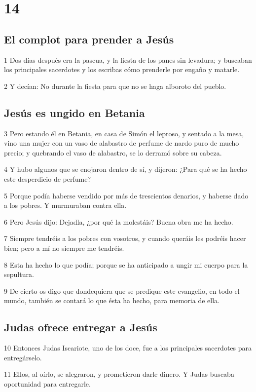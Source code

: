 \chapter{14}

\section*{El complot para prender a Jesús}

\par 1 Dos días después era la pascua, y la fiesta de los panes sin levadura; y buscaban los principales sacerdotes y los escribas cómo prenderle por engaño y matarle.
\par 2 Y decían: No durante la fiesta para que no se haga alboroto del pueblo.

\section*{Jesús es ungido en Betania}

\par 3 Pero estando él en Betania, en casa de Simón el leproso, y sentado a la mesa, vino una mujer con un vaso de alabastro de perfume de nardo puro de mucho precio; y quebrando el vaso de alabastro, se lo derramó sobre su cabeza.
\par 4 Y hubo algunos que se enojaron dentro de sí, y dijeron: ¿Para qué se ha hecho este desperdicio de perfume?
\par 5 Porque podía haberse vendido por más de trescientos denarios, y haberse dado a los pobres. Y murmuraban contra ella.
\par 6 Pero Jesús dijo: Dejadla, ¿por qué la molestáis? Buena obra me ha hecho.
\par 7 Siempre tendréis a los pobres con vosotros, y cuando queráis les podréis hacer bien; pero a mí no siempre me tendréis.
\par 8 Esta ha hecho lo que podía; porque se ha anticipado a ungir mi cuerpo para la sepultura.
\par 9 De cierto os digo que dondequiera que se predique este evangelio, en todo el mundo, también se contará lo que ésta ha hecho, para memoria de ella.

\section*{Judas ofrece entregar a Jesús}

\par 10 Entonces Judas Iscariote, uno de los doce, fue a los principales sacerdotes para entregárselo.
\par 11 Ellos, al oírlo, se alegraron, y prometieron darle dinero. Y Judas buscaba oportunidad para entregarle.

